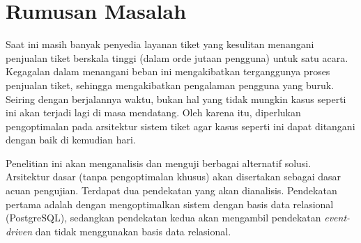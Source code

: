 \section{Rumusan Masalah}

Saat ini masih banyak penyedia layanan tiket yang kesulitan menangani penjualan tiket berskala tinggi (dalam orde jutaan pengguna) untuk satu acara. Kegagalan dalam menangani beban ini mengakibatkan terganggunya proses penjualan tiket, sehingga mengakibatkan pengalaman pengguna yang buruk. Seiring dengan berjalannya waktu, bukan hal yang tidak mungkin kasus seperti ini akan terjadi lagi di masa mendatang. Oleh karena itu, diperlukan pengoptimalan pada arsitektur sistem tiket agar kasus seperti ini dapat ditangani dengan baik di kemudian hari.

Penelitian ini akan menganalisis dan menguji berbagai alternatif solusi. Arsitektur dasar (tanpa pengoptimalan khusus) akan disertakan sebagai dasar acuan pengujian. Terdapat dua pendekatan yang akan dianalisis. Pendekatan pertama adalah dengan mengoptimalkan sistem dengan basis data relasional (PostgreSQL), sedangkan pendekatan kedua akan mengambil pendekatan \textit{event-driven} dan tidak menggunakan basis data relasional.